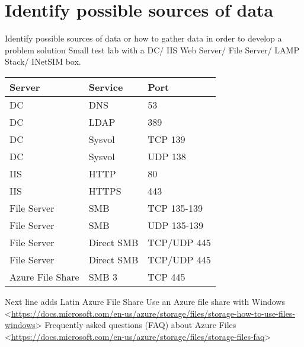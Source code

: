 \documentclass[12pt]{report}
\begin{document}
\section*{Identify possible sources of data}
Identify possible sources of data or how to gather data in order to develop a problem solution
\newline
Small test lab with a DC/ IIS Web Server/ File Server/ LAMP Stack/ INetSIM box.
\newline
\newline
\maketitle
\begin{tabular}{|l|l|l|}
\hline
\textbf{Server} & \textbf{Service} & \textbf{Port}\\
\hline
DC & DNS & 53\\
\hline
DC & LDAP & 389\\
\hline
DC & Sysvol & TCP 139\\
\hline
DC & Sysvol & UDP 138\\
\hline
IIS & HTTP & 80\\
\hline
IIS & HTTPS & 443\\
\hline
File Server & SMB & TCP 135-139\\
\hline
File Server & SMB & UDP 135-139\\
\hline
File Server & Direct SMB & TCP/UDP 445\\
\hline
File Server & Direct SMB & TCP/UDP 445\\
\hline
Azure File Share & SMB 3 & TCP 445\\
\hline
\end{tabular}
\newline
\newline
Next line adds Latin
\newline
\newline
Azure File Share 
Use an Azure file share with Windows
<\url{https://docs.microsoft.com/en-us/azure/storage/files/storage-how-to-use-files-windows}>
\newline
Frequently asked questions (FAQ) about Azure Files
<\url{https://docs.microsoft.com/en-us/azure/storage/files/storage-files-faq}>
\end{document}
